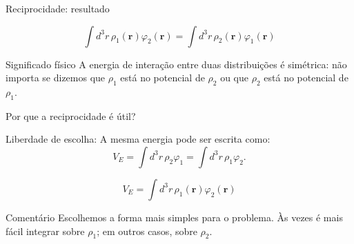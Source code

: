 \documentclass[aspectratio=169,11pt]{beamer}
\begin{document}
\begin{frame}{Reciprocidade: resultado}

\begin{eqbox}
\begin{equation}
\int d^3r\, \rho_1(\mathbf r)\varphi_2(\mathbf r)
=
\int d^3r\, \rho_2(\mathbf r)\varphi_1(\mathbf r)
\tag{3.70}
\end{equation}
\end{eqbox}

\begin{alertblock}{Significado físico}
A energia de interação entre duas distribuições é simétrica:
não importa se dizemos que \(\rho_1\) está no potencial de \(\rho_2\)
ou que \(\rho_2\) está no potencial de \(\rho_1\).
\end{alertblock}

\end{frame}

\begin{frame}{Por que a reciprocidade é útil?}

\begin{mybox}{Liberdade de escolha: }
A mesma energia pode ser escrita como:
\[
V_E
=
\int d^3r\,\rho_2\varphi_1
=
\int d^3r\,\rho_1\varphi_2.
\]
\end{mybox}

\begin{eqbox}
\begin{equation}
V_E
=
\int d^3r\, \rho_1(\mathbf r)\varphi_2(\mathbf r)
\tag{3.71}
\end{equation}
\end{eqbox}

\begin{alertblock}{Comentário}
Escolhemos a forma mais simples para o problema.
Às vezes é mais fácil integrar sobre \(\rho_1\); em outros casos, sobre \(\rho_2\).
\end{alertblock}

\end{frame}
\end{document}

